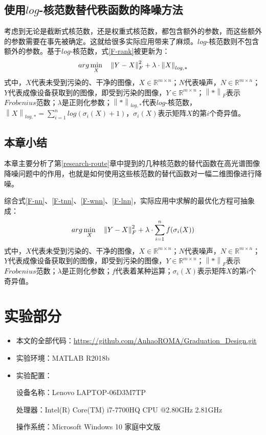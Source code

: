\documentclass[12pt, a4paper]{article}
\begin{document}
\subsection{使用$log$-核范数替代秩函数的降噪方法}
\par 考虑到无论是截断式核范数，还是权重式核范数，都包含额外的参数，而这些额外的参数需要在事先被确定。这就给很多实际应用带来了麻烦。$log$-核范数则不包含额外的参数。基于$log$-核范数，式\ref{F-rank}被更新为：
\begin{equation}
\centering
arg\min\limits_{X} \quad \left\|Y-X\right\|_F^2 + \lambda \cdot \left\|X\right\|_{log,*}
\label{F-lnn}
\end{equation}
式中，$X$代表未受到污染的、干净的图像，$X \in \mathbb{R}^{m \times n}$；$N$代表噪声，$N \in \mathbb{R}^{m \times n}$；$Y$代表成像设备获取到的图像，即受到污染的图像，$Y \in \mathbb{R}^{m \times n}$；$\left\|*\right\|_F$表示$Frobenius$范数；$\lambda$是正则化参数；$\left\|*\right\|_{log,*}$代表$log$-核范数，$\left\|X\right\|_{log,*} = \sum\limits_{i=1}^{n}log(\sigma_i(X)+1)$，$\sigma_i(X)$表示矩阵$X$的第$i$个奇异值。

\subsection{本章小结}
\par 本章主要分析了第\ref{research-route}章中提到的几种核范数的替代函数在高光谱图像降噪问题中的作用，也就是如何使用这些核范数的替代函数对一幅二维图像进行降噪。
\par 综合式\ref{F-nn}、\ref{F-tnn}、\ref{F-wnn}、\ref{F-lnn}，实际应用中求解的最优化方程可抽象成：
\begin{displaymath}
\centering
arg\min\limits_{X} \quad \left\|Y-X\right\|_F^2 + \lambda \cdot \sum\limits_{i=1}^{n}f(\sigma_i(X))
\end{displaymath}
式中，$X$代表未受到污染的、干净的图像，$X \in \mathbb{R}^{m \times n}$；$N$代表噪声，$N \in \mathbb{R}^{m \times n}$；$Y$代表成像设备获取到的图像，即受到污染的图像，$Y \in \mathbb{R}^{m \times n}$；$\left\|*\right\|_F$表示$Frobenius$范数；$\lambda$是正则化参数；$f$代表着某种运算；$\sigma_i(X)$表示矩阵$X$的第$i$个奇异值。
\newpage
\section{实验部分}\label{experiment}
\begin{itemize}
\item 本文的全部代码：{\url{https://github.com/AnhaoROMA/Graduation_Design.git}}
\item 实验环境：MATLAB R2018b
\item 实验配置：
\par 设备名称：Lenovo LAPTOP-06D3M7TP
\par 处理器：Intel(R) Core(TM) i7-7700HQ CPU @2.80GHz 2.81GHz
\par 操作系统：Microsoft Windows 10 家庭中文版
\end{itemize}
\end{document}
